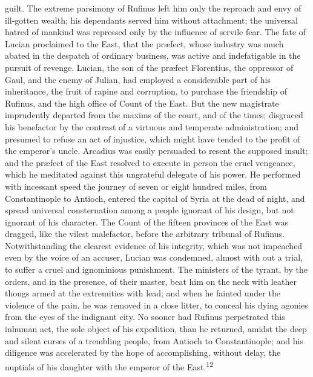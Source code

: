 guilt. The extreme parsimony of Rufinus left him only the
reproach and envy of ill-gotten wealth; his dependants served him
without attachment; the universal hatred of mankind was repressed
only by the influence of servile fear. The fate of Lucian
proclaimed to the East, that the præfect, whose industry was
much abated in the despatch of ordinary business, was active and
indefatigable in the pursuit of revenge. Lucian, the son of the
præfect Florentius, the oppressor of Gaul, and the enemy of
Julian, had employed a considerable part of his inheritance, the
fruit of rapine and corruption, to purchase the friendship of
Rufinus, and the high office of Count of the East. But the new
magistrate imprudently departed from the maxims of the court, and
of the times; disgraced his benefactor by the contrast of a
virtuous and temperate administration; and presumed to refuse an
act of injustice, which might have tended to the profit of the
emperor’s uncle. Arcadius was easily persuaded to resent the
supposed insult; and the præfect of the East resolved to execute
in person the cruel vengeance, which he meditated against this
ungrateful delegate of his power. He performed with incessant
speed the journey of seven or eight hundred miles, from
Constantinople to Antioch, entered the capital of Syria at the
dead of night, and spread universal consternation among a people
ignorant of his design, but not ignorant of his character. The
Count of the fifteen provinces of the East was dragged, like the
vilest malefactor, before the arbitrary tribunal of Rufinus.
Notwithstanding the clearest evidence of his integrity, which was
not impeached even by the voice of an accuser, Lucian was
condemned, almost with out a trial, to suffer a cruel and
ignominious punishment. The ministers of the tyrant, by the
orders, and in the presence, of their master, beat him on the
neck with leather thongs armed at the extremities with lead; and
when he fainted under the violence of the pain, he was removed in
a close litter, to conceal his dying agonies from the eyes of the
indignant city. No sooner had Rufinus perpetrated this inhuman
act, the sole object of his expedition, than he returned, amidst
the deep and silent curses of a trembling people, from Antioch to
Constantinople; and his diligence was accelerated by the hope of
accomplishing, without delay, the nuptials of his daughter with
the emperor of the East.\textsuperscript{12}


